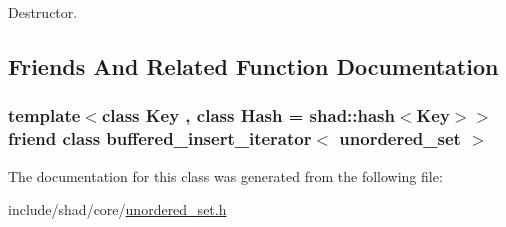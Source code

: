 Destructor. 



\subsection{Friends And Related Function Documentation}
\hypertarget{classshad_1_1unordered__set_a37f994eeafee71345ca4e4e8cd1435e8}{
\subsubsection[{buffered\-\_\-insert\-\_\-iterator$<$ unordered\-\_\-set $>$}]{\setlength{\rightskip}{0pt plus 5cm}template$<$class Key , class Hash  = shad\-::hash$<$\-Key$>$$>$ friend class {\bf buffered\-\_\-insert\-\_\-iterator}$<$ {\bf unordered\-\_\-set} $>$\hspace{0.3cm}{\ttfamily [friend]}}}\label{classshad_1_1unordered__set_a37f994eeafee71345ca4e4e8cd1435e8}


The documentation for this class was generated from the following file\-:\begin{DoxyCompactItemize}
\item 
include/shad/core/\hyperlink{unordered__set_8h}{unordered\-\_\-set.\-h}\end{DoxyCompactItemize}
